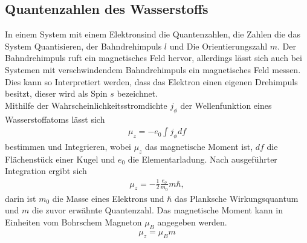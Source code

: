 \subsection{Quantenzahlen des Wasserstoffs}
In einem System mit einem Elektronsind  die Quantenzahlen, die Zahlen die das System Quantisieren, der Bahndrehimpuls $l$ und Die Orientierungszahl $m$. Der Bahndrehimpuls ruft ein magnetisches Feld hervor, allerdings lässt sich auch bei Systemen mit verschwindendem Bahndrehimpuls ein magnetisches Feld messen. Dies kann so Interpretiert werden, dass das Elektron einen eigenen Drehimpuls besitzt, dieser wird als Spin $s$ bezeichnet.\\
Mithilfe der Wahrscheinlichkeitsstromdichte $j_\phi$ der Wellenfunktion eines Wasserstoffatoms lässt sich
\begin{align}
	\mu_z=-e_0\int j_\phi df
\end{align}
bestimmen und Integrieren, wobei $\mu_z$ das magnetische Moment ist, $df$ die Flächenstück einer Kugel und $e_0$ die Elementarladung. Nach ausgeführter Integration ergibt sich 
\begin{align}
	\mu_z=-\frac{1}{2}\frac{e_o}{m_0}m\hbar,
\end{align}
darin ist $m_0$ die Masse eines Elektrons und $\hbar$ das Planksche Wirkungsquantum und $m$ die zuvor erwähnte Quantenzahl. Das magnetische Moment kann in Einheiten vom Bohrschem Magneton $\mu_B$ angegeben werden.
\begin{align}
	\mu_z = \mu_B m
\end{align}
